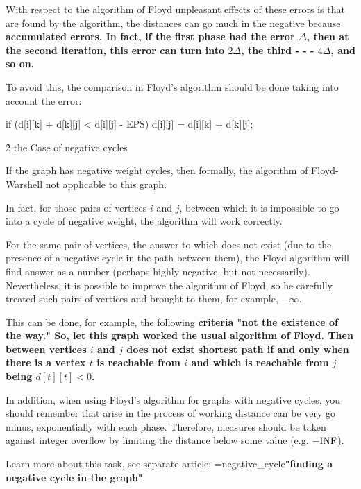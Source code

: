 With respect to the algorithm of Floyd unpleasant effects of these errors is that are found by the algorithm, the distances can go much in the negative because \bf{accumulated errors}. In fact, if the first phase had the error $\Delta$, then at the second iteration, this error can turn into $2 \Delta$, the third - - - $4 \Delta$, and so on.

To avoid this, the comparison in Floyd's algorithm should be done taking into account the error:

\code
if (d[i][k] + d[k][j] < d[i][j] - EPS)
d[i][j] = d[i][k] + d[k][j];
\endcode


\h2{ the Case of negative cycles }

If the graph has negative weight cycles, then formally, the algorithm of Floyd-Warshell not applicable to this graph.

In fact, for those pairs of vertices $i$ and $j$, between which it is impossible to go into a cycle of negative weight, the algorithm will work correctly.

For the same pair of vertices, the answer to which does not exist (due to the presence of a negative cycle in the path between them), the Floyd algorithm will find answer as a number (perhaps highly negative, but not necessarily). Nevertheless, it is possible to improve the algorithm of Floyd, so he carefully treated such pairs of vertices and brought to them, for example, $- \infty$.

This can be done, for example, the following \bf{criteria} "not the existence of the way." So, let this graph worked the usual algorithm of Floyd. Then between vertices $i$ and $j$ does not exist shortest path if and only when there is a vertex $t$ is reachable from $i$ and which is reachable from $j$ being $d[t][t] < 0$.

In addition, when using Floyd's algorithm for graphs with negative cycles, you should remember that arise in the process of working distance can be very go minus, exponentially with each phase. Therefore, measures should be taken against integer overflow by limiting the distance below some value (e.g. $- {\rm INF}$).

Learn more about this task, see separate article: \algohref=negative_cycle{\bf{"finding a negative cycle in the graph"}}.
